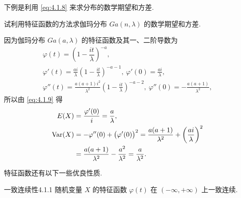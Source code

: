 下例是利用 \eqref{eq:4.1.8} 来求分布的数学期望和方差.

\begin{example}\label{exam:4.1.3}
    试利用特征函数的方法求伽玛分布 $ Ga ( n, \lambda ) $ 的数学期望和方差.
\end{example}

\begin{solution}
    因为伽玛分布 $ Ga ( a, \lambda ) $ 的特征函数及其一、二阶导数为
    \begin{gather*}
        \varphi (t) = \left( 1 - \dfrac{it}{\lambda} \right)^{-a},\\
        \varphi' (t) = \frac{ai}{\lambda} \left( 1 - \frac{it}{\lambda} \right)^{-a-1}, \ \varphi' (0) = \frac{ai}{\lambda},\\
        \varphi'' (t) = \frac{a ( a + 1 ) i^2}{\lambda^2} \left( 1 - \frac{it}{\lambda} \right)^{-a-2}, \ \varphi'' (0) = -\frac{a (a+1)}{\lambda^2},
    \end{gather*}
    所以由 \eqref{eq:4.1.9} 得
    \begin{align*}
        E (X) & = \frac{\varphi' (0)}{i} = \frac{a}{\lambda},\\
       \Var  (X) & = - \varphi'' (0) + \bigl( \varphi' (0) \bigr)^2 = \frac{a (a+1)}{\lambda^2} + \left( \frac{ai}{\lambda} \right)^2\\
        & = \frac{a (a+1)}{\lambda^2} - \frac{a^2}{\lambda^2} = \frac{a}{\lambda^2}.
    \end{align*}
\end{solution}

特征函数还有以下一些优良性质.

\begin{theorem}{一致连续性}{4.1.1}
    随机变量 $ X $ 的特征函数 $ \varphi (t) $ 在 $ ( -\infty, +\infty ) $ 上一致连续.
\end{theorem}

